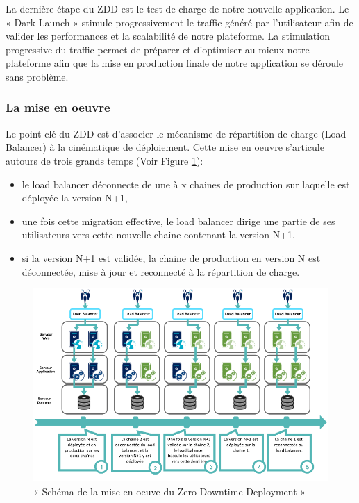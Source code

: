 \documentclass{report}
\begin{document}
          La dernière étape du ZDD est le test de charge de notre nouvelle application. Le « Dark Launch » stimule progressivement le traffic généré par l’utilisateur afin de valider les performances et la scalabilité de notre plateforme. La stimulation progressive du traffic permet de préparer et d’optimiser au mieux notre plateforme afin que la mise en production finale de notre application se déroule sans problème.

          \subsubsection{La mise en oeuvre}
          Le point clé du ZDD est d'associer le mécanisme de répartition de charge (Load Balancer) à la cinématique de déploiement. Cette mise en oeuvre s'articule autours de trois grands temps (Voir Figure \ref{LoadBalancer}):\\
          \begin{itemize}
            \item le load balancer déconnecte de une à x chaines de production sur laquelle est déployée la version N+1,
            \item une fois cette migration effective, le load balancer dirige une partie de ses utilisateurs vers cette nouvelle chaine contenant la version N+1,
            \item si la version N+1 est validée, la chaine de production en version N est déconnectée, mise à jour et reconnecté à la répartition de charge.\\
          \end{itemize}

          \begin{figure}
            \begin{center}
              \includegraphics[scale=0.6]{images/LoadBalancer.png}
            \end{center}
            \caption{« Schéma de la mise en oeuve du Zero Downtime Deployment »}
            \label{LoadBalancer}
          \end{figure}
\end{document}
